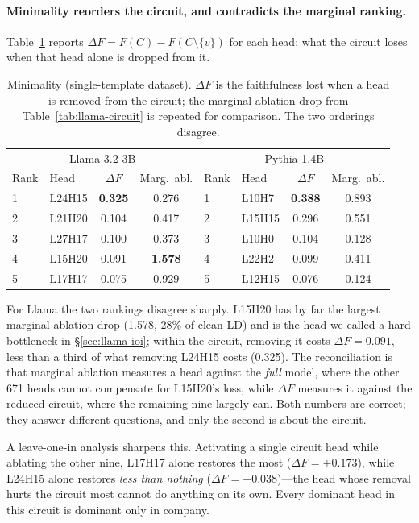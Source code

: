 \documentclass[11pt,a4paper]{article}
\begin{document}
\paragraph{Minimality reorders the circuit, and contradicts the marginal ranking.}
Table~\ref{tab:minimality} reports $\Delta F = F(C) - F(C \setminus \{v\})$ for each head:
what the circuit loses when that head alone is dropped from it.

\begin{table}[H]
  \centering
  \caption{Minimality (single-template dataset). $\Delta F$ is the faithfulness lost when
    a head is removed from the circuit; the marginal ablation drop from
    Table~\ref{tab:llama-circuit} is repeated for comparison. The two orderings disagree.}
  \label{tab:minimality}
  \smallskip
  \begin{tabular}{llcc|llcc}
    \toprule
    \multicolumn{4}{c|}{Llama-3.2-3B} & \multicolumn{4}{c}{Pythia-1.4B} \\
    Rank & Head & $\Delta F$ & Marg.\ abl. & Rank & Head & $\Delta F$ & Marg.\ abl. \\
    \midrule
    1 & L24H15 & \textbf{0.325} & 0.276 & 1 & L10H7  & \textbf{0.388} & 0.893 \\
    2 & L21H20 & 0.104 & 0.417 & 2 & L15H15 & 0.296 & 0.551 \\
    3 & L27H17 & 0.100 & 0.373 & 3 & L10H0  & 0.104 & 0.128 \\
    4 & L15H20 & 0.091 & \textbf{1.578} & 4 & L22H2  & 0.099 & 0.411 \\
    5 & L17H17 & 0.075 & 0.929 & 5 & L12H15 & 0.076 & 0.124 \\
    \bottomrule
  \end{tabular}
\end{table}

For Llama the two rankings disagree sharply. L15H20 has by far the largest marginal
ablation drop (1.578, 28\% of clean LD) and is the head we called a hard bottleneck in
\S\ref{sec:llama-ioi}; within the circuit, removing it costs $\Delta F = 0.091$, less than
a third of what removing L24H15 costs (0.325). The reconciliation is that marginal
ablation measures a head against the \emph{full} model, where the other 671 heads cannot
compensate for L15H20's loss, while $\Delta F$ measures it against the reduced circuit,
where the remaining nine largely can. Both numbers are correct; they answer different
questions, and only the second is about the circuit.

A leave-one-in analysis sharpens this. Activating a single circuit head while ablating
the other nine, L17H17 alone restores the most ($\Delta F = +0.173$), while L24H15 alone
restores \emph{less than nothing} ($\Delta F = -0.038$)---the head whose removal hurts
the circuit most cannot do anything on its own. Every dominant head in this circuit is
dominant only in company.
\end{document}

